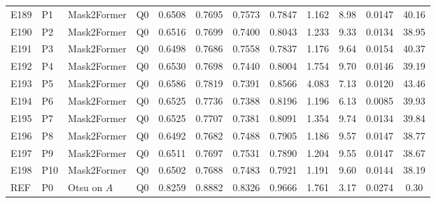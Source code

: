 \begin{longtable}{@{}lllllccccccc@{}}
E189 & P1 & Mask2Former & Q0 & 0.6508 & 0.7695 & 0.7573 & 0.7847 & 1.162 & 8.98 & 0.0147 & 40.16 \\
E190 & P2 & Mask2Former & Q0 & 0.6516 & 0.7699 & 0.7400 & 0.8043 & 1.233 & 9.33 & 0.0134 & 38.95 \\
E191 & P3 & Mask2Former & Q0 & 0.6498 & 0.7686 & 0.7558 & 0.7837 & 1.176 & 9.64 & 0.0154 & 40.37 \\
E192 & P4 & Mask2Former & Q0 & 0.6530 & 0.7698 & 0.7440 & 0.8004 & 1.754 & 9.70 & 0.0146 & 39.19 \\
E193 & P5 & Mask2Former & Q0 & 0.6586 & 0.7819 & 0.7391 & 0.8566 & 4.083 & 7.13 & 0.0120 & 43.46 \\
E194 & P6 & Mask2Former & Q0 & 0.6525 & 0.7736 & 0.7388 & 0.8196 & 1.196 & 6.13 & 0.0085 & 39.93 \\
E195 & P7 & Mask2Former & Q0 & 0.6525 & 0.7707 & 0.7381 & 0.8091 & 1.354 & 9.74 & 0.0134 & 39.84 \\
E196 & P8 & Mask2Former & Q0 & 0.6492 & 0.7682 & 0.7488 & 0.7905 & 1.186 & 9.57 & 0.0147 & 38.77 \\
E197 & P9 & Mask2Former & Q0 & 0.6511 & 0.7697 & 0.7531 & 0.7890 & 1.204 & 9.55 & 0.0147 & 38.67 \\
E198 & P10 & Mask2Former & Q0 & 0.6502 & 0.7688 & 0.7483 & 0.7921 & 1.191 & 9.60 & 0.0144 & 38.19 \\
REF & P0 & Otsu on $A$ & Q0 & 0.8259 & 0.8882 & 0.8326 & 0.9666 & 1.761 & 3.17 & 0.0274 & 0.30 \\
\end{longtable}
\endgroup
